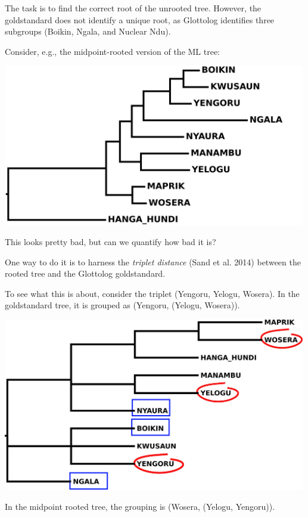 \documentclass[
  a4paper,
  14pt,
  oneside,
  tablecaptionabove
]{scrbook}
\begin{document}
{The task is to find the correct root of the unrooted tree. However, the
goldstandard does not identify a unique root, as Glottolog identifies
three subgroups (Boikin, Ngala, and Nuclear Ndu).}

{Consider, e.g., the midpoint-rooted version of the ML tree:}

{\includegraphics[width=5.21875in,height=2.78125in]{images/Ndu.midpointRooted.jpg}}

{This looks pretty bad, but can we quantify how bad it is?}

{One way to do it is to harness the \emph{triplet distance} (Sand et al.
2014) between the rooted tree and the Glottolog goldstandard.}

{To see what this is about, consider the triplet (Yengoru, Yelogu,
Wosera). In the goldstandard tree, it is grouped as (Yengoru, (Yelogu,
Wosera)).}

{\includegraphics[width=5.20833in,height=2.96875in]{images/Ndu.glot_triplets.jpg}}

{In the midpoint rooted tree, the grouping is (Wosera, (Yelogu,
Yengoru)).}
\end{document}
